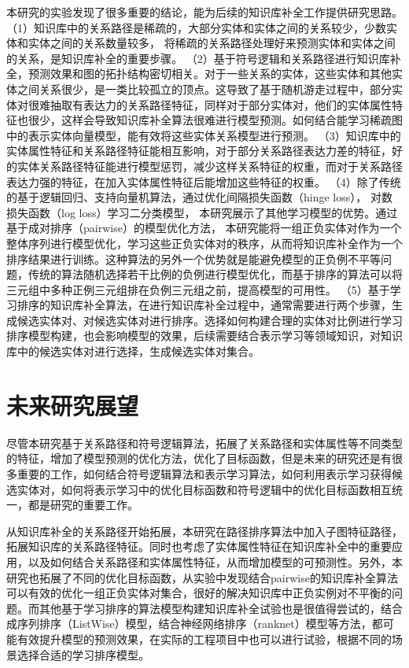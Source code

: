 本研究的实验发现了很多重要的结论，能为后续的知识库补全工作提供研究思路。
（1）知识库中的关系路径是稀疏的，大部分实体和实体之间的关系较少，少数实体和实体之间的关系数量较多，
将稀疏的关系路径处理好来预测实体和实体之间的关系，是知识库补全的重要步骤。
（2）基于符号逻辑和关系路径进行知识库补全，预测效果和图的拓扑结构密切相关。对于一些关系的实体，这些实体和其他实体之间关系很少，是一类比较孤立的顶点。这导致了基于随机游走过程中，部分实体对很难抽取有表达力的关系路径特征，同样对于部分实体对，他们的实体属性特征也很少，这样会导致知识库补全算法很难进行模型预测。如何结合能学习稀疏图中的表示实体向量模型，能有效将这些实体关系模型进行预测。
（3）知识库中的实体属性特征和关系路径特征能相互影响，对于部分关系路径表达力差的特征，好的实体关系路径特征能进行模型惩罚，减少这样关系特征的权重，而对于关系路径表达力强的特征，在加入实体属性特征后能增加这些特征的权重。
（4）除了传统的基于逻辑回归、支持向量机算法，通过优化间隔损失函数（hinge loss），
对数损失函数（log loss）学习二分类模型，
本研究展示了其他学习模型的优势。通过基于成对排序（pairwise）的模型优化方法，
本研究能将一组正负实体对作为一个整体序列进行模型优化，学习这些正负实体对的秩序，从而将知识库补全作为一个排序结果进行训练。这种算法的另外一个优势就是能避免模型的正负例不平等问题，传统的算法随机选择若干比例的负例进行模型优化，而基于排序的算法可以将三元组中多种正例三元组排在负例三元组之前，提高模型的可用性。
（5）基于学习排序的知识库补全算法，在进行知识库补全过程中，通常需要进行两个步骤，生成候选实体对、对候选实体对进行排序。选择如何构建合理的实体对比例进行学习排序模型构建，也会影响模型的效果，后续需要结合表示学习等领域知识，对知识库中的候选实体对进行选择，生成候选实体对集合。

\section{未来研究展望}
尽管本研究基于关系路径和符号逻辑算法，拓展了关系路径和实体属性等不同类型的特征，增加了模型预测的优化方法，优化了目标函数，但是未来的研究还是有很多重要的工作，如何结合符号逻辑算法和表示学习算法，如何利用表示学习获得候选实体对，如何将表示学习中的优化目标函数和符号逻辑中的优化目标函数相互统一，都是研究的重要工作。

从知识库补全的关系路径开始拓展，本研究在路径排序算法中加入子图特征路径，拓展知识库的关系路径特征。同时也考虑了实体属性特征在知识库补全中的重要应用，以及如何结合关系路径和实体属性特征，从而增加模型的可预测性。另外，本研究也拓展了不同的优化目标函数，从实验中发现结合pairwise的知识库补全算法可以有效的优化一组正负实体对集合，很好的解决知识库中正负实例对不平衡的问题。而其他基于学习排序的算法模型构建知识库补全试验也是很值得尝试的，结合成序列排序（ListWise）模型，结合神经网络排序（ranknet）模型等方法，都可能有效提升模型的预测效果，在实际的工程项目中也可以进行试验，根据不同的场景选择合适的学习排序模型。


